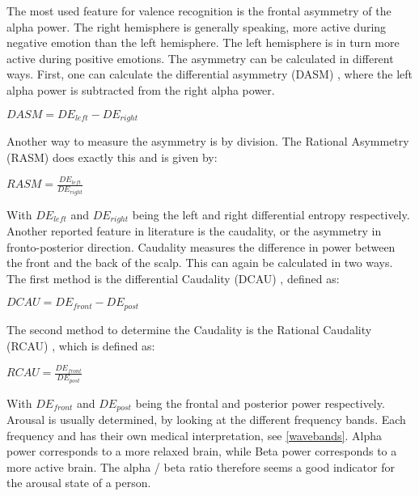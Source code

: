 \npar

The most used feature for valence recognition is the frontal asymmetry of the alpha power\cite{GivenPaper}. The right hemisphere is generally speaking, more active during negative emotion than the left hemisphere. The left hemisphere is in turn more active during positive emotions\cite{RealTimeEEGEmotion,EEGDatasets,killyPaper}. The asymmetry can be calculated in different ways. First, one can calculate the differential asymmetry (DASM) , where the left alpha power is subtracted from the right alpha power.

\begin{center}
$DASM = DE_{left} - DE_{right}$
\end{center}

Another way to measure the asymmetry is by division. The Rational Asymmetry (RASM)  does exactly this and is given by: \\

\begin{center}
$RASM = \frac{DE_{left}}{DE_{right}}$
\end{center}

With $DE_{left}$ and $DE_{right}$ being the left and right differential entropy respectively. Another reported feature in literature is the caudality, or the asymmetry in fronto-posterior direction\cite{caudality}. Caudality measures the difference in power between the front and the back of the scalp. This can again be calculated in two ways. The first method is the differential Caudality (DCAU) , defined as: \\

\begin{center}
$DCAU = DE_{front} - DE_{post}$
\end{center}

The second method to determine the Caudality is the Rational Caudality (RCAU) , which is defined as:

\begin{center}
$RCAU = \frac{DE_{front}}{DE_{post}}$
\end{center}

With $DE_{front}$ and $DE_{post}$ being the frontal and posterior power respectively. Arousal is usually determined, by looking at the different frequency bands\citep{ExtendedPaper}. Each frequency and has their own medical interpretation, see \ref{wavebands}. Alpha power corresponds to a more relaxed brain, while Beta power corresponds to a more active brain. The alpha / beta ratio therefore seems a good indicator for the arousal state of a person.

